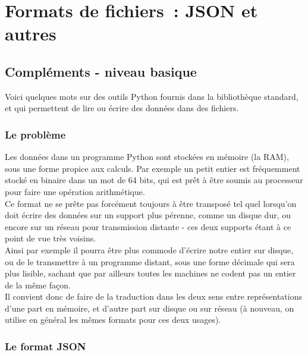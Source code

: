     \hypertarget{formats-de-fichiers-json-et-autres}{%
\section{Formats de fichiers~: JSON et
autres}\label{formats-de-fichiers-json-et-autres}}

    \hypertarget{compluxe9ments---niveau-basique}{%
\subsection{Compléments - niveau
basique}\label{compluxe9ments---niveau-basique}}

    Voici quelques mots sur des outils Python fournis dans la bibliothèque
standard, et qui permettent de lire ou écrire des données dans des
fichiers.

    \hypertarget{le-probluxe8me}{%
\subsubsection{Le problème}\label{le-probluxe8me}}

    Les données dans un programme Python sont stockées en mémoire (la RAM),
sous une forme propice aux calculs. Par exemple un petit entier est
fréquemment stocké en binaire dans un mot de 64 bits, qui est prêt à
être soumis au processeur pour faire une opération arithmétique.\\

    Ce format ne se prête pas forcément toujours à être transposé tel quel
lorsqu'on doit écrire des données sur un support plus pérenne, comme un
disque dur, ou encore sur un réseau pour transmission distante - ces
deux supports étant à ce point de vue très voisins.\\

Ainsi par exemple il pourra être plus commode d'écrire notre entier sur
disque, ou de le transmettre à un programme distant, sous une forme
décimale qui sera plus lisible, sachant que par ailleurs toutes les
machines ne codent pas un entier de la même façon.\\

    Il convient donc de faire de la traduction dans les deux sens entre
représentations d'une part en mémoire, et d'autre part sur disque ou sur
réseau (à nouveau, on utilise en général les mêmes formats pour ces deux
usages).

    \hypertarget{le-format-json}{%
\subsubsection{Le format JSON}\label{le-format-json}}

